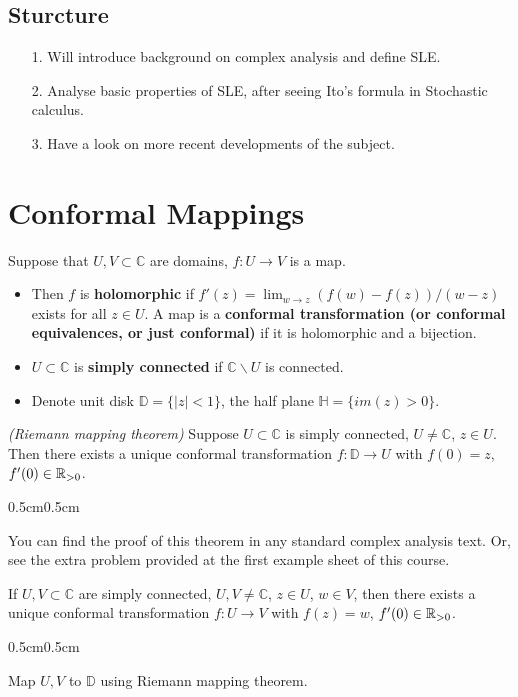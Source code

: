 \documentclass[12pt,a4paper]{article}
\newenvironment{proof}
{\begin{changemargin}{0.5cm}{0.5cm} 
	}%
	{\end{changemargin}
}
\begin{document}
\subsection{Sturcture}
\begin{itemize}
\item[1.] Will introduce background on complex analysis and define SLE.
\item[2.] Analyse basic properties of SLE, after seeing Ito's formula in Stochastic calculus.
\item[3.] Have a look on more recent developments of the subject.
\end{itemize}

\section{Conformal Mappings}

Suppose that $U, V \subset \mathbb{C}$ are domains, $f: U\rightarrow V$ is a map.

\begin{itemize}
\item Then $f$ is \textbf{holomorphic} if $f'(z)=\lim_{w\rightarrow z} (f(w)-f(z))/(w-z)$ exists for all $z\in U$. A map is a \textbf{conformal transformation (or conformal equivalences, or just conformal)} if it is holomorphic and a bijection. 
\item $U\subset \mathbb{C}$ is \textbf{simply connected} if $\mathbb{C}\backslash U$ is connected.
\item Denote unit disk $\mathbb{D} = \{|z|<1\}$, the half plane $\mathbb{H} = \{im(z)>0\}$.
\end{itemize}
\s

\thm \emph{(Riemann mapping theorem)} Suppose $U\subset \mathbb{C}$ is simply connected, $U\neq \mathbb{C}$, $z\in U$. Then there exists a unique conformal transformation $f: \mathbb{D}\rightarrow U$ with $f(0)=z$, $f'(0)\in \mathbb{R}_{>0}$.
\begin{proof}
\pf You can find the proof of this theorem in any standard complex analysis text. Or, see the extra problem provided at the first example sheet of this course.
\end{proof}
\s

\corr If $U, V\subset \mathbb{C}$ are simply connected, $U, V\neq \mathbb{C}$, $z\in U$, $w\in V$, then there exists a unique conformal transformation $f: U\rightarrow V$ with $f(z)=w$, $f'(0)\in \mathbb{R}_{>0}$.
\begin{proof}
\pf Map $U, V$ to $\mathbb{D}$ using Riemann mapping theorem. \eop
\end{proof}
\s
\end{document}
